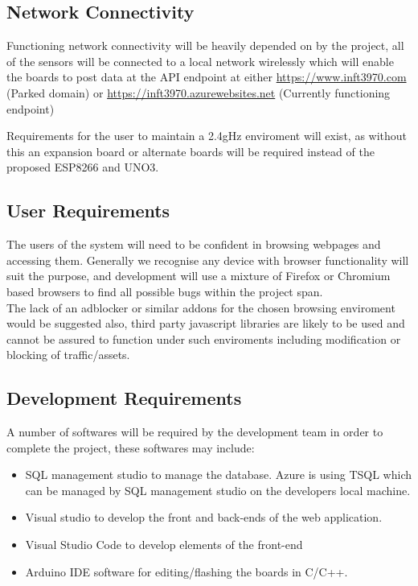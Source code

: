 \documentclass{article}
\newcounter{num}
\begin{document}
        \subsection{Network Connectivity}
            Functioning network connectivity will be heavily depended on by the project,
            all of the sensors will be connected to a local network wirelessly which will enable the boards
            to post data at the API endpoint at either \url{https://www.inft3970.com} (Parked domain) or 
            \url{https://inft3970.azurewebsites.net} (Currently functioning endpoint)
            \par
            Requirements for the user to maintain a 2.4gHz enviroment will exist, as without this an expansion board
            or alternate boards will be required instead of the proposed ESP8266\cite{ESP8266} and UNO3\cite{UNO3}.
        
        \subsection{User Requirements}
            The users of the system will need to be confident in browsing webpages and accessing them. Generally
            we recognise any device with browser functionality will suit the purpose, and development will use a 
            mixture of Firefox\cite{Firefox} or Chromium\cite{Chromium} based browsers to find all possible bugs 
            within the project span.
            \\
            The lack of an adblocker or similar addons for the chosen browsing enviroment would be suggested also,
            third party javascript libraries are likely to be used and cannot be assured to function under such 
            enviroments including modification or blocking of traffic/assets.
        
        \subsection{Development Requirements\cite{DevelopmentResources}}
            A number of softwares will be required by the development team in order to complete the project,
            these softwares may include:
            \begin{itemize}
                \item SQL management studio to manage the database. Azure is using TSQL which can be managed by SQL management studio 
                on the developers local machine.
                \item Visual studio to develop the front and back-ends of the web application. 
                \item Visual Studio Code to develop elements of the front-end
                \item Arduino IDE software for editing/flashing the boards in C/C++.
            \end{itemize}
\end{document}
